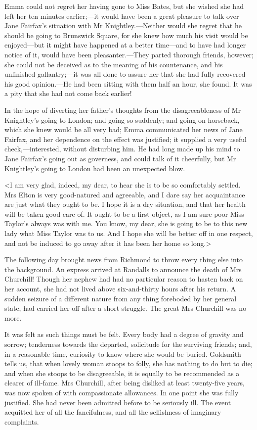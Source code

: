 Emma could not regret her having gone to Miss Bates, but she wished she had left her ten minutes earlier;—it would have been a great pleasure to talk over Jane Fairfax's situation with Mr Knightley.—Neither would she regret that he should be going to Brunswick Square, for she knew how much his visit would be enjoyed—but it might have happened at a better time—and to have had longer notice of it, would have been pleasanter.—They parted thorough friends, however; she could not be deceived as to the meaning of his countenance, and his unfinished gallantry;—it was all done to assure her that she had fully recovered his good opinion.—He had been sitting with them half an hour, she found. It was a pity that she had not come back earlier!

In the hope of diverting her father's thoughts from the disagreeableness of Mr Knightley's going to London; and going so suddenly; and going on horseback, which she knew would be all very bad; Emma communicated her news of Jane Fairfax, and her dependence on the effect was justified; it supplied a very useful check,—interested, without disturbing him. He had long made up his mind to Jane Fairfax's going out as governess, and could talk of it cheerfully, but Mr Knightley's going to London had been an unexpected blow.

<I am very glad, indeed, my dear, to hear she is to be so comfortably settled. Mrs Elton is very good-natured and agreeable, and I dare say her acquaintance are just what they ought to be. I hope it is a dry situation, and that her health will be taken good care of. It ought to be a first object, as I am sure poor Miss Taylor's always was with me. You know, my dear, she is going to be to this new lady what Miss Taylor was to us. And I hope she will be better off in one respect, and not be induced to go away after it has been her home so long.>

The following day brought news from Richmond to throw every thing else into the background. An express arrived at Randalls to announce the death of Mrs Churchill! Though her nephew had had no particular reason to hasten back on her account, she had not lived above six-and-thirty hours after his return. A sudden seizure of a different nature from any thing foreboded by her general state, had carried her off after a short struggle. The great Mrs Churchill was no more.

It was felt as such things must be felt. Every body had a degree of gravity and sorrow; tenderness towards the departed, solicitude for the surviving friends; and, in a reasonable time, curiosity to know where she would be buried. Goldsmith tells us, that when lovely woman stoops to folly, she has nothing to do but to die; and when she stoops to be disagreeable, it is equally to be recommended as a clearer of ill-fame. Mrs Churchill, after being disliked at least twenty-five years, was now spoken of with compassionate allowances. In one point she was fully justified. She had never been admitted before to be seriously ill. The event acquitted her of all the fancifulness, and all the selfishness of imaginary complaints.

